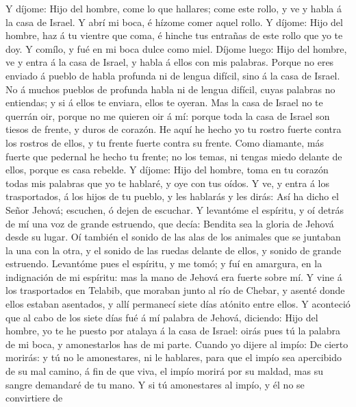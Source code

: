  Y díjome: Hijo del hombre, come lo que hallares; come
este rollo, y ve y habla á la casa de Israel.  Y abrí mi
boca, é hízome comer aquel rollo.  Y díjome: Hijo del
hombre, haz á tu vientre que coma, é hinche tus entrañas de este rollo
que yo te doy. Y comílo, y fué en mi boca dulce como miel.
 Díjome luego: Hijo del hombre, ve y entra á la casa de
Israel, y habla á ellos con mis palabras.  Porque no eres
enviado á pueblo de habla profunda ni de lengua difícil, sino á la casa
de Israel.  No á muchos pueblos de profunda habla ni de
lengua difícil, cuyas palabras no entiendas; y si á ellos te enviara,
ellos te oyeran.  Mas la casa de Israel no te querrán oir,
porque no me quieren oir á mí: porque toda la casa de Israel son tiesos
de frente, y duros de corazón.  He aquí he hecho yo tu
rostro fuerte contra los rostros de ellos, y tu frente fuerte contra su
frente.  Como diamante, más fuerte que pedernal he hecho
tu frente; no los temas, ni tengas miedo delante de ellos, porque es
casa rebelde.  Y díjome: Hijo del hombre, toma en tu
corazón todas mis palabras que yo te hablaré, y oye con tus oídos.
 Y ve, y entra á los trasportados, á los hijos de tu
pueblo, y les hablarás y les dirás: Así ha dicho el Señor Jehová;
escuchen, ó dejen de escuchar.  Y levantóme el espíritu,
y oí detrás de mí una voz de grande estruendo, que decía: Bendita sea la
gloria de Jehová desde su lugar.  Oí también el sonido de
las alas de los animales que se juntaban la una con la otra, y el sonido
de las ruedas delante de ellos, y sonido de grande estruendo.
 Levantóme pues el espíritu, y me tomó; y fuí en
amargura, en la indignación de mi espíritu: mas la mano de Jehová era
fuerte sobre mí.  Y vine á los trasportados en Telabib,
que moraban junto al río de Chebar, y asenté donde ellos estaban
asentados, y allí permanecí siete días atónito entre ellos.
 Y aconteció que al cabo de los siete días fué á mí
palabra de Jehová, diciendo:  Hijo del hombre, yo te he
puesto por atalaya á la casa de Israel: oirás pues tú la palabra de mi
boca, y amonestarlos has de mi parte.  Cuando yo dijere
al impío: De cierto morirás: y tú no le amonestares, ni le hablares,
para que el impío sea apercibido de su mal camino, á fin de que viva, el
impío morirá por su maldad, mas su sangre demandaré de tu mano.
 Y si tú amonestares al impío, y él no se convirtiere de

